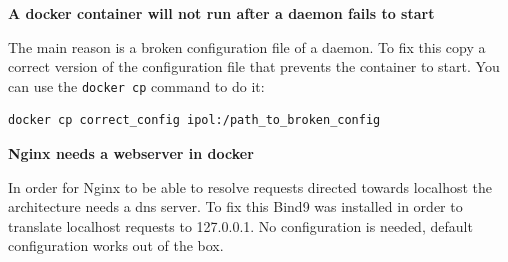 \documentclass[a4paper,12pt]{article}
\begin{document}
\textbf{A docker container will not run after a daemon fails to start}

The main reason is a broken configuration file of a daemon. To fix this copy a correct version of the configuration file that prevents the container to start. You can use the {\tt docker cp} command to do it:

\begin{verbatim}
docker cp correct_config ipol:/path_to_broken_config
\end{verbatim}

\textbf{Nginx needs a webserver in docker}

In order for Nginx to be able to resolve requests directed towards localhost the architecture needs a dns server. To fix this Bind9 was installed in order to translate localhost requests to 127.0.0.1. No configuration is needed, default configuration works out of the box.



\end{document}
